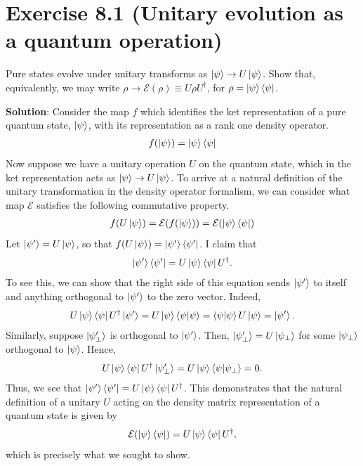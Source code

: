 \documentclass{book}
\newcommand{\mc}[1]{\mathcal{#1}}
\begin{document}
\section*{Exercise 8.1 (Unitary evolution as a quantum operation)}
    Pure states evolve under unitary transforms as $\ket{\psi}\rightarrow U\ket{\psi}$. Show that, equivalently, we may write $\rho \rightarrow \mc{E}(\rho) \equiv U \rho U^\dagger$, for $\rho = \ket{\psi}\bra{\psi}$.
    
    \textbf{Solution}: Consider the map $f$ which identifies the ket representation of a pure quantum state, $\ket{\psi}$, with its representation as a rank one density operator.
    \begin{align}
        f(\ket{\psi}) = \ket{\psi}\bra{\psi}
    \end{align}
    Now suppose we have a unitary operation $U$ on the quantum state, which in the ket representation acts as $\ket{\psi}\to U\ket{\psi}$. To arrive at a natural definition of the unitary transformation in the density operator formalism, we can consider what map $\mc{E}$ satisfies the following commutative property.
    \begin{align}
        f(U\ket{\psi}) = \mc{E}(f(\ket{\psi})) = \mc{E}(\ket{\psi}\bra{\psi})
    \end{align}
    Let $\ket{\psi'} = U\ket{\psi}$, so that $f(U\ket{\psi}) = \ket{\psi'}\bra{\psi'}$. I claim that
    \begin{align}
        \ket{\psi'}\bra{\psi'} = U \ket{\psi}\bra{\psi} U^\dagger.
    \end{align}
    To see this, we can show that the right side of this equation sends $\ket{\psi'}$ to itself and anything orthogonal to $\ket{\psi'}$ to the zero vector. Indeed,
    \begin{align}
        U\ket{\psi}\bra{\psi}U^\dagger \ket{\psi'} = U \ket{\psi}\bra{\psi}\ket{\psi} = \bra{\psi}\ket{\psi} U \ket{\psi} = \ket{\psi'}.
    \end{align}
    Similarly, suppose $\ket{\psi'_\perp}$ is orthogonal to $\ket{\psi'}$. Then, $\ket{\psi'_\perp} = U \ket{\psi_\perp}$ for some $\ket{\psi_\perp}$ orthogonal to $\ket{\psi}$. Hence,
    \begin{align}
         U\ket{\psi}\bra{\psi}U^\dagger \ket{\psi'_\perp} = U\ket{\psi}\bra{\psi} \ket{\psi_\perp} = 0.
    \end{align}
    Thus, we see that $\ket{\psi'}\bra{\psi'} = U\ket{\psi}\bra{\psi}U^\dagger$. This demonstrates that the natural definition of a unitary $U$ acting on the density matrix representation of a quantum state is given by
    \begin{align}
        \mc{E}(\ket{\psi}\bra{\psi}) = U\ket{\psi}\bra{\psi}U^\dagger,
    \end{align}
    which is precisely what we sought to show. 
    
\end{document}
